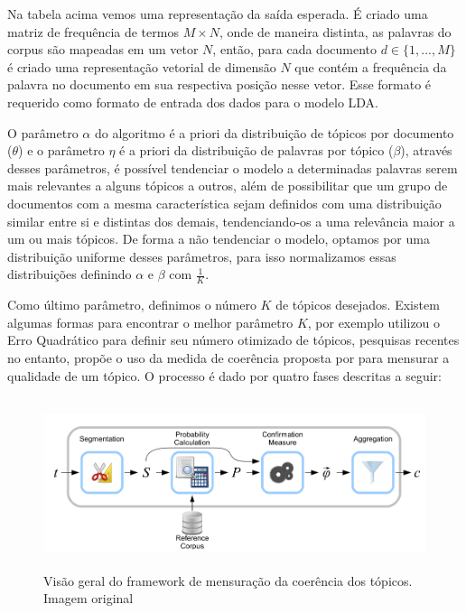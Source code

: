 \documentclass[12pt,a4paper]{article}
\begin{document}
Na tabela acima vemos uma representação da saída esperada. É criado uma matriz de frequência de termos $M \times N$, onde de maneira distinta, as palavras do corpus são mapeadas em um vetor $N$, então, para cada documento $d \in \{1,. . . , M\}$ é criado uma representação vetorial de dimensão $N$ que contém a frequência da palavra no documento em sua respectiva posição nesse vetor. Esse formato é requerido como formato de entrada dos dados para o modelo LDA.

O parâmetro $\alpha$ do algoritmo é a priori da distribuição de tópicos por documento ($\theta$) e o parâmetro $\eta$ é a priori da distribuição de palavras por tópico ($\beta$), através desses parâmetros, é possível  tendenciar o modelo a determinadas palavras serem mais relevantes a alguns tópicos a outros, além de possibilitar que um grupo de documentos com a mesma característica sejam definidos com uma distribuição similar entre si e distintas dos demais, tendenciando-os a uma relevância maior a um ou mais tópicos. De forma a não tendenciar o modelo, optamos por uma distribuição uniforme desses parâmetros, para isso normalizamos essas distribuições definindo $\alpha$ e $\beta$ com $\frac{1}{K}$.

Como último parâmetro, definimos o número $K$ de tópicos desejados. Existem algumas formas para encontrar o melhor parâmetro $K$,  por exemplo utilizou o Erro Quadrático para definir seu número otimizado de tópicos, pesquisas recentes no entanto, propõe o uso da medida de coerência proposta por  para mensurar a qualidade de um tópico. O processo é dado por quatro fases descritas a seguir:


\begin{figure}[h]
	\centering
    \includegraphics[height=5cm]{images/figure_3.png}
    \caption{Visão geral do framework de mensuração da coerência dos tópicos. Imagem original }
\end{figure}
\end{document}
